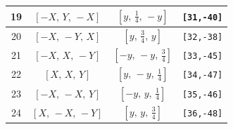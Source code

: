 \documentclass[fleqn,8pt]{jsarticle}
\begin{document}
\begin{longtable}{cccc}
19 & $\left[ - X,\, Y,\, - X \right]$ & $\left[ y,\, \frac{1}{4},\, - y \right]$ & {\tt [31,-40]} \\ \hline
20 & $\left[ - X,\, - Y,\, X \right]$ & $\left[ y,\, \frac{3}{4},\, y \right]$ & {\tt [32,-38]} \\ \hline
21 & $\left[ - X,\, X,\, - Y \right]$ & $\left[ - y,\, - y,\, \frac{3}{4} \right]$ & {\tt [33,-45]} \\ \hline
22 & $\left[ X,\, X,\, Y \right]$ & $\left[ y,\, - y,\, \frac{1}{4} \right]$ & {\tt [34,-47]} \\ \hline
23 & $\left[ - X,\, - X,\, Y \right]$ & $\left[ - y,\, y,\, \frac{1}{4} \right]$ & {\tt [35,-46]} \\ \hline
24 & $\left[ X,\, - X,\, - Y \right]$ & $\left[ y,\, y,\, \frac{3}{4} \right]$ & {\tt [36,-48]} \\
\end{longtable}
\renewcommand{\arraystretch}{1.2}
\end{document}
